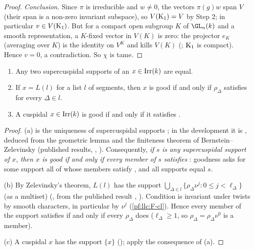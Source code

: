 \begin{proof}
\emph{Conclusion.} Since $\pi$ is irreducible and $w\ne0$, the vectors $\pi(g)w$ span $V$ (their span is a non-zero invariant subspace), so
$V(\mathrm{K}_1)=V$ by Step 2; in particular $v\in V(\mathrm{K}_1)$. But for a compact open subgroup $K$ of $\GL_n(k)$ and a smooth representation, a
$K$-fixed vector in $V(K)$ is zero: the projector $e_K$ (averaging over $K$) is the identity on $V^K$ and kills $V(K)$
(; $\mathrm{K}_1$ is compact). Hence $v=0$, a contradiction. So $\chi$ is tame.
\end{proof}

\begin{proposition}\label{pf:sh-misc:goodseg}
\begin{enumerate}[label=(\alph*)]
\item Any two supercuspidal supports of an $x\in\operatorname{Irr}(k)$ are equal.
\item If $x=L(l)$ for a list $l$ of segments, then $x$ is good if and only if $\rho_\Delta$ satisfies \shmiscGo{} for every $\Delta\in l$.
\item A cuspidal $x\in\operatorname{Irr}(k)$ is good if and only if it satisfies \shmiscGo{}.
\end{enumerate}
\end{proposition}

\begin{proof}
(a) is the uniqueness of supercuspidal supports \cite[Thm.~2.9]{BernsteinZelevinsky1977}; in the development it is
, deduced from the geometric lemma and the finiteness theorem
of Bernstein--Zelevinsky (published results, , ).
Consequently, \emph{if $s$ is any supercuspidal support of $x$, then $x$ is good if and only if every member of $s$ satisfies} \shmiscGo{}:
goodness asks for some support all of whose members satisfy \shmiscGo{}, and all supports equal $s$.

(b) By Zelevinsky's theorem, $L(l)$ has the support $\bigcup_{\Delta\in l}\{\rho_\Delta\nu^j:0\le j<\ell_\Delta\}$ (as a multiset)
(, from the published result ,
\cite{Zelevinsky1980}). Condition \shmiscGo{} is invariant under twists by smooth characters, in particular by $\nu^j$
(\ref{pf:llc:F-cl}). Hence every member of the support satisfies \shmiscGo{} if and only if every $\rho_\Delta$ does ($\ell_\Delta\ge1$, so
$\rho_\Delta=\rho_\Delta\nu^0$ is a member).

(c) A cuspidal $x$ has the support $\{x\}$ (); apply the consequence of (a).
\end{proof}

